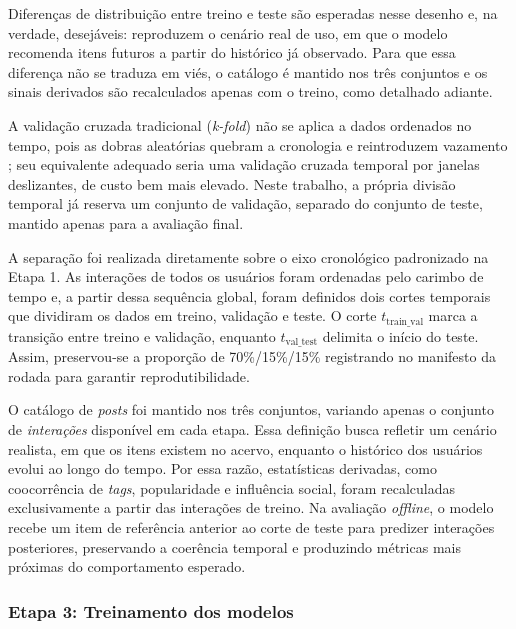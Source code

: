 \documentclass[a4paper,12pt]{article}
\begin{document}
{Diferenças de distribuição entre treino e teste são esperadas nesse desenho e, na verdade, desejáveis: reproduzem o cenário real de uso, em que o modelo recomenda itens futuros a partir do histórico já observado. Para que essa diferença não se traduza em viés, o catálogo é mantido nos três conjuntos e os sinais derivados são recalculados apenas com o treino, como detalhado adiante.

A validação cruzada tradicional (\textit{k-fold}) não se aplica a dados ordenados no tempo, pois as dobras aleatórias quebram a cronologia e reintroduzem vazamento \cite{BERGMEIR2012192}; seu equivalente adequado seria uma validação cruzada temporal por janelas deslizantes, de custo bem mais elevado. Neste trabalho, a própria divisão temporal já reserva um conjunto de validação, separado do conjunto de teste, mantido apenas para a avaliação final.

A separação foi realizada diretamente sobre o eixo cronológico padronizado na Etapa 1. As interações de todos os usuários foram ordenadas pelo carimbo de tempo e, a partir dessa sequência global, foram definidos dois cortes temporais que dividiram os dados em treino, validação e teste. O corte $t_{\text{train\_val}}$ marca a transição entre treino e validação, enquanto
$t_{\text{val\_test}}$ delimita o início do teste. Assim, preservou-se a proporção de 70\%/15\%/15\% registrando no manifesto da rodada para garantir reprodutibilidade.

O catálogo de \textit{posts} foi mantido nos três conjuntos, variando apenas o conjunto de \emph{interações} disponível em cada etapa. Essa definição busca refletir um cenário realista, em que os itens existem no acervo, enquanto o histórico dos usuários evolui ao longo do tempo. Por essa razão, estatísticas derivadas, como coocorrência de \textit{tags}, popularidade e influência social, foram recalculadas exclusivamente a partir das interações de treino. Na avaliação \textit{offline}, o modelo recebe um item de referência anterior ao corte de teste para predizer interações posteriores, preservando a coerência temporal e produzindo métricas mais próximas do comportamento esperado.

\subsubsection{Etapa 3: Treinamento dos modelos}


}
\end{document}
